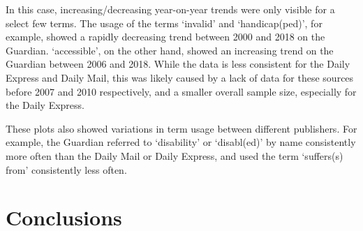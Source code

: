 \documentclass{report}
\begin{document}
In this case, increasing/decreasing year-on-year trends were only visible for a select few terms.
The usage of the terms `invalid' and `handicap(ped)', for example, showed a rapidly decreasing trend between 2000 and 2018 on the Guardian.
`accessible', on the other hand, showed an increasing trend on the Guardian between 2006 and 2018.
While the data is less consistent for the Daily Express and Daily Mail, this was likely caused by a lack of data for these sources before 2007 and 2010 respectively, and a smaller overall sample size, especially for the Daily Express.

These plots also showed variations in term usage between different publishers.
For example, the Guardian referred to `disability' or `disabl(ed)' by name consistently more often than the Daily Mail or Daily Express, and used the term `suffers(s) from' consistently less often.






\chapter{Conclusions} \label{Conclusions}  %

\end{document}
